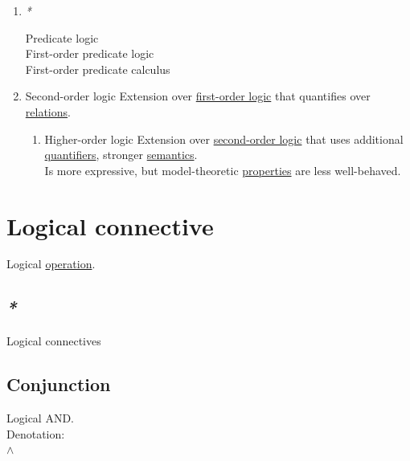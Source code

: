 \documentclass[a4paper,14pt,oneside]{book}
\begin{document}
\begin{enumerate}
\item \emph{*}
\label{sec:orgedb332f}

\label{org07f558b}Predicate logic\\
\label{orgd60c8e4}First-order predicate logic\\
\label{orgeb3a201}First-order predicate calculus\\

\item \label{org8abe8f5}Second-order logic
\label{sec:orgb569919}
Extension over \hyperref[org4fc68c1]{first-order logic} that quantifies over \hyperref[orgd960451]{relations}.\\

\begin{enumerate}
\item \label{orgec2449b}Higher-order logic
\label{sec:org99d1656}
Extension over \hyperref[org8abe8f5]{second-order logic} that uses additional \hyperref[orgdd911c2]{quantifiers}, stronger \hyperref[org0fdf3be]{semantics}.\\

Is more expressive, but model-theoretic \hyperref[orge2c24e7]{properties} are less well-behaved.\\
\end{enumerate}
\end{enumerate}

\section{\label{org6006a04}Logical connective}
\label{sec:orgb598512}
Logical \hyperref[org53f0458]{operation}.\\

\subsection{\emph{*}}
\label{sec:orgbe59345}

\label{orga89c90b}Logical connectives\\

\subsection{\label{orgf371367}Conjunction}
\label{sec:orgb6bfb47}
Logical AND.\\

Denotation:\\
\(\land\)\\
\end{document}
